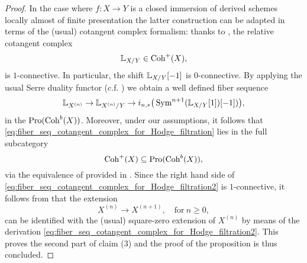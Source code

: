 \documentclass[10pt,a4paper,reqno]{amsart} %
\theoremstyle{plain}
\theoremstyle{definition}
\theoremstyle{remark}
\numberwithin{equation}{section}
\begin{document}
\begin{proof}
    In the case where $f \colon X \to Y$ is a closed immersion
    of derived schemes locally almost of finite presentation the latter construction can be adapted in terms of the
    (usual) cotangent complex
    formalism: thanks to \cite[Corollary 8.4.3.2]{Lurie_Higher_algebra}, the relative cotangent complex
        \[
            \mathbb L_{X/ Y} \in \mathrm{Coh}^+(X),  
        \]
    is $1$-connective. In particular, the shift $\mathbb L_{X/ Y}[-1]$ is $0$-connective.
    By applying the usual Serre duality functor (c.f. \cite[\S 9]{Gaitsgory_IndCoh}) we obtain a well defined fiber sequence
        \begin{equation} \label{eq:fiber_seq_cotangent_complex_for_Hodge_filtration2}
            \mathbb L_{X^{(n)}} \to \mathbb L_{X^{(n)}/ Y} \to i_{n,*}\big(  \operatorname{Sym}^{n+1}(\mathbb L_{X/ Y}[1])[-1]) \big) ,
        \end{equation}
    in the \infcat $\mathrm{Pro}(\mathrm{Coh}^b(X))$. Moreover, under our assumptions, it follows that \eqref{eq:fiber_seq_cotangent_complex_for_Hodge_filtration}
    lies in the full subcategory 
        \[\mathrm{Coh}^+(X) \subseteq \mathrm{Pro}(\mathrm{Coh}^b(X)),\]
    via the equivalence of \infcats provided in \cite[Corollary 1.4.4.2]{Gaitsgory_Study_II}.
    Since the right hand side of \eqref{eq:fiber_seq_cotangent_complex_for_Hodge_filtration2}
    is $1$-connective, it follows from \cite[\S 8, 5.5]{Gaitsgory_Study_II} that the extension
        \[
            X^{(n)} \to X^{(n+1)}, \quad \mathrm{for} \ n \ge 0,  
        \]
    can be identified with the (usual) square-zero extension of $X^{(n)}$ by means of the derivation \eqref{eq:fiber_seq_cotangent_complex_for_Hodge_filtration2}. This proves the second part
    of claim (3) and the proof of the proposition is thus concluded.
\end{proof}
\end{document}
